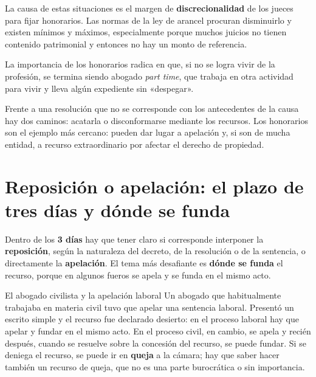 \documentclass[12pt,oneside]{book}
\begin{document}
La causa de estas situaciones es el margen de \textbf{discrecionalidad} de los jueces para fijar honorarios. Las normas de la ley de arancel procuran disminuirlo y existen mínimos y máximos, especialmente porque muchos juicios no tienen contenido patrimonial y entonces no hay un monto de referencia.

La importancia de los honorarios radica en que, si no se logra vivir de la profesión, se termina siendo abogado \textit{part time}, que trabaja en otra actividad para vivir y lleva algún expediente sin «despegar».

\begin{important}
Frente a una resolución que no se corresponde con los antecedentes de la causa hay dos caminos: acatarla o disconformarse mediante los recursos. Los honorarios son el ejemplo más cercano: pueden dar lugar a apelación y, si son de mucha entidad, a recurso extraordinario por afectar el derecho de propiedad.
\end{important}

\section{Reposición o apelación: el plazo de tres días y dónde se funda}

Dentro de los \textbf{3 días} hay que tener claro si corresponde interponer la \textbf{reposición}, según la naturaleza del decreto, de la resolución o de la sentencia, o directamente la \textbf{apelación}. El tema más desafiante es \textbf{dónde se funda} el recurso, porque en algunos fueros se apela y se funda en el mismo acto.

\begin{example}{El abogado civilista y la apelación laboral}
Un abogado que habitualmente trabajaba en materia civil tuvo que apelar una sentencia laboral. Presentó un escrito simple y el recurso fue declarado desierto: en el proceso laboral hay que apelar y fundar en el mismo acto. En el proceso civil, en cambio, se apela y recién después, cuando se resuelve sobre la concesión del recurso, se puede fundar. Si se deniega el recurso, se puede ir en \textbf{queja} a la cámara; hay que saber hacer también un recurso de queja, que no es una parte burocrática o sin importancia.
\end{example}
\end{document}
